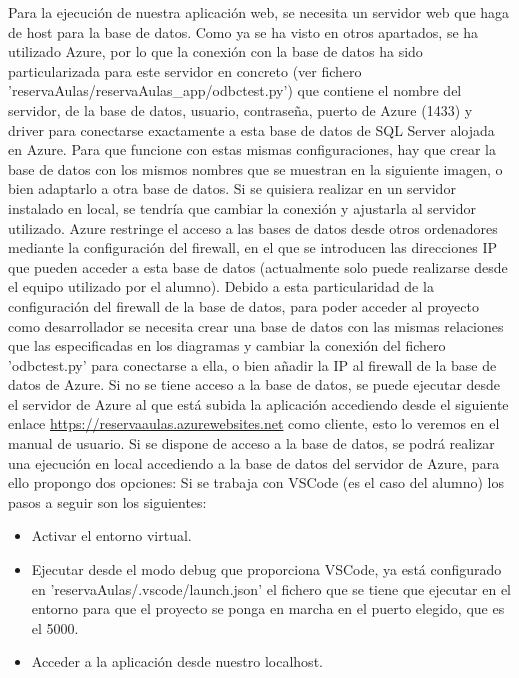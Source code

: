 \label{ConexionDB}
Para la ejecución de nuestra aplicación web, se necesita un servidor web que haga de host para la base de datos. Como ya se ha visto en otros apartados, se ha utilizado Azure, por lo que la conexión con la base de datos ha sido particularizada para este servidor en concreto (ver fichero 'reservaAulas/reservaAulas\_app/odbctest.py') que contiene el nombre del servidor, de la base de datos, usuario, contraseña, puerto de Azure (1433) y driver para conectarse exactamente a esta base de datos de SQL Server alojada en Azure. Para que funcione con estas mismas configuraciones, hay que crear la base de datos con los mismos nombres que se muestran en la siguiente imagen, o bien adaptarlo a otra base de datos.\newline
{}
\newline Si se quisiera realizar en un servidor instalado en local, se tendría que cambiar la conexión y ajustarla al servidor utilizado. Azure restringe el acceso a las bases de datos desde otros ordenadores mediante la configuración del firewall, en el que se introducen las direcciones IP que pueden acceder a esta base de datos (actualmente solo puede realizarse desde el equipo utilizado por el alumno).\newline
{}
\newline
Debido a esta particularidad de la configuración del firewall de la base de datos, para poder acceder al proyecto como desarrollador se necesita crear una base de datos con las mismas relaciones que las especificadas en los diagramas y cambiar la conexión del fichero 'odbctest.py' para conectarse a ella, o bien añadir la IP al firewall de la base de datos de Azure.\newline
Si no se tiene acceso a la base de datos, se puede ejecutar desde el servidor de Azure al que está subida la aplicación accediendo desde el siguiente enlace \url{https://reservaaulas.azurewebsites.net} como cliente, esto lo veremos en el manual de usuario.\newline
Si se dispone de acceso a la base de datos, se podrá realizar una ejecución en local accediendo a la base de datos del servidor de Azure, para ello propongo dos opciones:\newline
Si se trabaja con VSCode (es el caso del alumno) los pasos a seguir son los siguientes:
\begin{itemize}
    \item Activar el entorno virtual.
    \item Ejecutar desde el modo debug que proporciona VSCode, ya está configurado en 'reservaAulas/.vscode/launch.json' el fichero que se tiene que ejecutar en el entorno para que el proyecto se ponga en marcha en el puerto elegido, que es el 5000.
    \item Acceder a la aplicación desde nuestro localhost.
\end{itemize}
